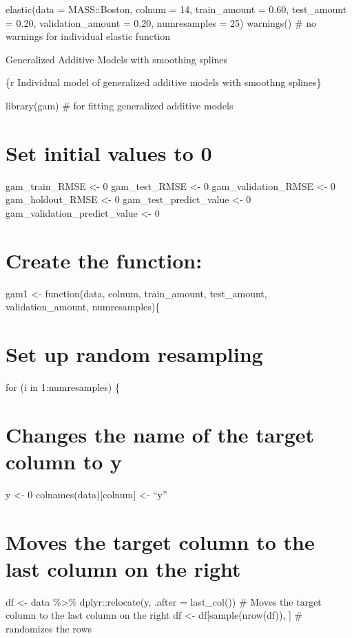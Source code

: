 \documentclass[
]{book}
\begin{document}
elastic(data = MASS::Boston, colnum = 14, train\_amount = 0.60,
test\_amount = 0.20, validation\_amount = 0.20, numresamples = 25)
warnings() \# no warnings for individual elastic function

Generalized Additive Models with smoothing splines

\{r Individual model of generalized additive models with smoothng
splines\}

library(gam) \# for fitting generalized additive models

\chapter{Set initial values to 0}\label{set-initial-values-to-0-5}

gam\_train\_RMSE \textless- 0 gam\_test\_RMSE \textless- 0 gam\_validation\_RMSE \textless- 0
gam\_holdout\_RMSE \textless- 0 gam\_test\_predict\_value \textless- 0
gam\_validation\_predict\_value \textless- 0

\chapter{Create the function:}\label{create-the-function-4}

gam1 \textless- function(data, colnum, train\_amount, test\_amount,
validation\_amount, numresamples)\{

\chapter{Set up random resampling}\label{set-up-random-resampling-4}

for (i in 1:numresamples) \{

\chapter{Changes the name of the target column to y}\label{changes-the-name-of-the-target-column-to-y-4}

y \textless- 0 colnames(data){[}colnum{]} \textless- ``y''

\chapter{Moves the target column to the last column on the right}\label{moves-the-target-column-to-the-last-column-on-the-right-4}

df \textless- data \%\textgreater\% dplyr::relocate(y, .after = last\_col()) \# Moves the
target column to the last column on the right df \textless-
df{[}sample(nrow(df)), {]} \# randomizes the rows
\end{document}
